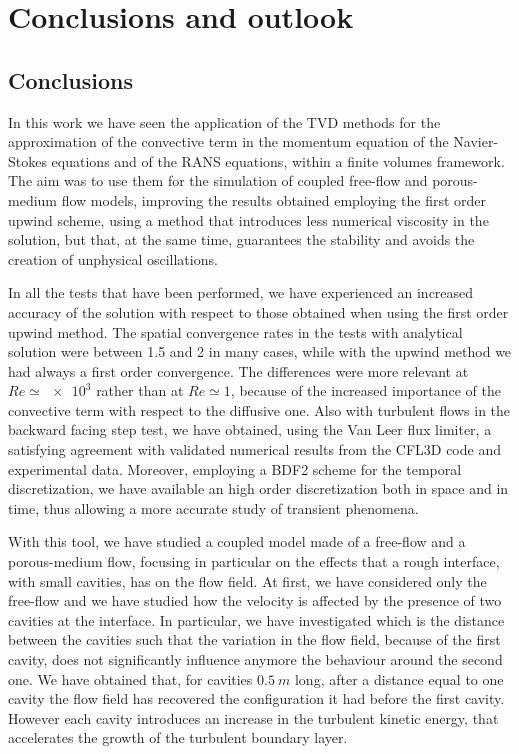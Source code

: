 \chapter{Conclusions and outlook}
\section{Conclusions}
In this work we have seen the application of the TVD methods for the 
approximation of the convective term in the momentum equation of the 
Navier-Stokes equations and of the RANS equations, within a finite volumes 
framework. The aim was to use them for the simulation of coupled free-flow and 
porous-medium flow models, improving the results obtained employing the 
first order upwind scheme, using a method that introduces less numerical 
viscosity in the solution, but that, at the same time, guarantees the stability 
and avoids the creation of unphysical oscillations.

In all the tests that have been performed, we have experienced an increased 
accuracy of the solution with respect to those obtained when using the first order 
upwind method. The spatial convergence rates in the tests with analytical 
solution were between 1.5 and 2 in many cases, while with the upwind method we had always a first order convergence. 
The differences were more relevant at $Re\simeq\num{e3}$ rather than at 
$Re\simeq1$, because of the increased importance of the convective term with 
respect to the diffusive one. Also with turbulent flows in the backward facing 
step test, we have 
obtained, using the Van Leer flux limiter, a satisfying agreement with 
validated numerical results from the CFL3D code and experimental data.
Moreover, employing a BDF2 scheme for the 
temporal discretization, we have available an high order discretization both 
in space and in time, thus allowing a more accurate study of transient 
phenomena.

With this tool, we have studied a coupled model made of a free-flow and a 
porous-medium flow, focusing in particular on the effects that a rough
interface, with small cavities, has on the flow field.
At first, we have considered only the free-flow and we have studied how the 
velocity is affected by the presence of two cavities at the interface.
In particular, we have investigated which is the distance between the cavities such that the variation in the flow field, 
because of the first cavity, does not significantly influence anymore the 
behaviour around the 
second one. We have obtained that, for cavities $\SI{0.5}{m}$ long, after a 
distance equal to one cavity the flow field has recovered the configuration it 
had before the first cavity. However each cavity introduces an increase in the 
turbulent kinetic energy, that accelerates the growth of the turbulent 
boundary layer.

